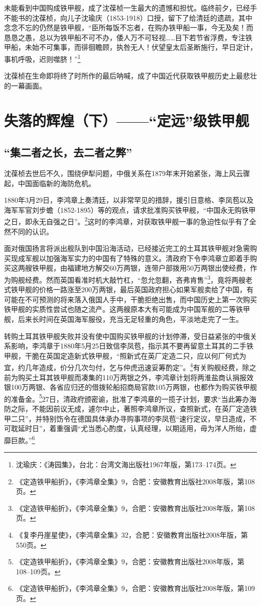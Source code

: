 \documentclass[12pt,UTF8]{ctexbook}
\begin{document}
未能看到中国购成铁甲舰，成了沈葆桢一生最大的遗憾和担忧。临终前夕，已经手不能书的沈葆桢，向儿子沈瑜庆（1853-1918）口授，留下了给清廷的遗疏，其中念念不忘的仍然是铁甲舰，“臣所每饭不忘者，在购办铁甲船一事，今无及矣！而恳恳之愚，总以为铁甲船不可不办，倭人万不可轻视……目下若节省浮费，专注铁甲船，未始不可集事，而徘徊瞻顾，执咎无人！伏望皇太后圣断施行，早日定计，事机呼吸，迟则噬脐！”\footnote{沈瑜庆：《涛园集》，台北：台湾文海出版社1967年版，第173--174页。}

沈葆桢在生命即将终了时所作的最后呐喊，成了中国近代获取铁甲舰历史上最悲壮的一幕画面。

\chapter{失落的辉煌（下）——“定远”级铁甲舰}

\section{“集二者之长，去二者之弊”}

沈葆桢去世后不久，围绕伊犁问题，中俄关系在1879年末开始紧张，海上风云骤起，中国面临新的海防危机。

1880年3月29日，李鸿章上奏清廷，以非常罕见的措辞，援引日意格、李凤苞以及海军军官刘步蟾（1852-1895）等的观点，请求批准购买铁甲舰，“中国永无购铁甲之日，即永无自强之日”。\footnote{《定造铁甲船折》，《李鸿章全集》9，合肥：安徽教育出版社2008年版，第108页。}这时的李鸿章，对获取铁甲舰一事的急迫性似乎有了全然不同的认识。

面对俄国扬言将派出舰队到中国沿海活动，已经接近完工的土耳其铁甲舰对急需购买现成军舰以加强海军实力的中国有了特殊的意义。清政府下令李鸿章立即着手购买这两艘铁甲舰，由福建地方解交60万两银，连带户部拨用50万两银出使经费，作为购舰经费。然而英国看准时机大敲竹杠，“忽允忽翻，吝弗肯售”\footnote{《定造铁甲船折》，《李鸿章全集》9，合肥：安徽教育出版社2008年版，第108页。}，竟将两艘老式铁甲舰的价格一路涨至200万两银，最后英国政府担心如果军舰卖给了中国，有可能在不可预测的将来落入俄国人手中，干脆拒绝出售，而中国历史上第一次购买铁甲舰的实质性尝试也随之流产。这两艘原本大有可能成为中国军舰的二等铁甲舰，后来长时间在英国海军服役，充当无足轻重的角色，平淡地走完了一生。

转购土耳其铁甲舰失败并没有使中国购买铁甲舰的计划停滞，受日益紧张的中俄关系影响，李鸿章于1880年5月25日致信李凤苞，指示其不要再留意土耳其的二手铁甲舰，干脆在英国定造新式铁甲舰，“照新式在英厂定造二只，应以何厂何式为宜，约几年造成，价分几次匀付，乞与仲虎迅速妥筹酌定”。\footnote{《复李丹崖星使》，《李鸿章全集》32，合肥：安徽教育出版社2008年版，第550页。}有关购舰经费，除之前为购买土耳其铁甲舰而凑集的110万两银之外，李鸿章计划将两淮盐商认捐报效银100万两银、各省应归还的借拨轮船招商局官款105万两银，也都作为购买铁甲舰的准备金。\footnote{《定造铁甲船折》，《李鸿章全集》9，合肥：安徽教育出版社2008年版，第108--109页。}27日，清政府颁密谕，批准了李鸿章的一揽子计划，要求“当此筹办海防之际，不能因前议无成，遽尔中止，著照李鸿章所议，查照新式，在英厂定造铁甲二只”，并特别饬令在德国具体承办寻购事项的李凤苞“速行定议，早日造成，不可耽延时日”，着重强调“尤当悉心酌度，认真经理，以期适用，毋为洋人所绐，虚靡巨款。”\footnote{《定造铁甲船折》，《李鸿章全集》9，合肥：安徽教育出版社2008年版，第109页。}
\end{document}
